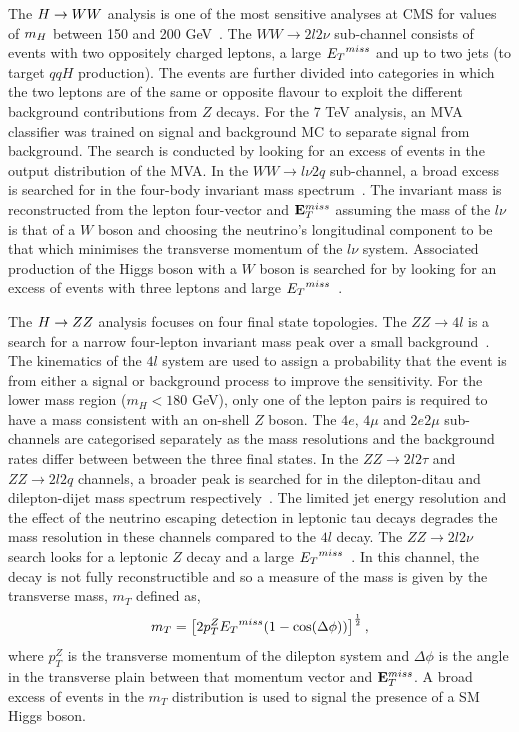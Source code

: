 The $H\rightarrow WW$ analysis is one of the most sensitive analyses at CMS for
values of $m_{H}$ between 150 and 200 GeV~\citep{HIG-12-017}. 
The $WW\rightarrow2l2\nu$ sub-channel consists of events with 
two oppositely charged leptons, a large ${E_{T}}^{miss}$ and up 
to two jets (to target $qqH$ production).
The events are further divided into categories in which the two leptons
are of the same or opposite flavour to exploit the different
background contributions from $Z$ decays. For the 7 TeV analysis,
an MVA classifier was trained on signal and background 
MC to separate signal from background. The search is conducted by looking 
for an excess of events in the output distribution of the MVA.
In the $WW\rightarrow l\nu 2q$ sub-channel, a broad excess is searched
for in the four-body invariant mass spectrum~\citep{HIG-12-021}. 
The invariant mass is reconstructed from the lepton four-vector and ${\mathbf{E}^{miss}_{T}}$ 
assuming the mass of the $l\nu$ is that of a $W$ boson and 
choosing the neutrino's longitudinal component to be that which minimises 
the transverse momentum of the $l\nu$ system.
Associated production of the Higgs boson with a $W$ boson is searched for 
by looking for an excess of events with three leptons and large 
${E_{T}}^{miss}$~\citep{HIG-11-034}.

The $H\rightarrow ZZ$ analysis focuses on four final state topologies.
The $ZZ\rightarrow 4l$ is a search for a narrow four-lepton invariant mass 
peak over a small background~\citep{HIG-12-016}. The kinematics of the $4l$ system are used
to assign a probability that the event is from either a signal or background 
process to improve the sensitivity. For the lower mass region ($m_{H}<180$ GeV),
only one of the lepton pairs is required to have a mass consistent with an 
on-shell $Z$ boson.
The $4e$, $4\mu$ and $2e2\mu$ sub-channels are categorised separately as the 
mass resolutions and the background rates differ between between the three 
final states. In the $ZZ\rightarrow 2l2\tau$ and $ZZ\rightarrow 2l2q$ channels, 
a broader peak is searched for in the dilepton-ditau and dilepton-dijet
mass spectrum respectively~\citep{HIG-12-016,HIG-11-027}. 
The limited jet energy resolution
and the effect of the neutrino escaping detection in leptonic tau decays
degrades the mass resolution in these channels compared to the $4l$ decay.
The $ZZ\rightarrow 2l2\nu$ search looks for a leptonic $Z$ decay
and a large ${E_{T}}^{miss}$~\citep{HIG-12-023}.
In this channel, the decay is not fully reconstructible and so a measure of the mass
is given by the transverse mass, $m_{T}$ defined as,
\begin{equation}
m_{T} = \left[2 p_{T}^{Z}{E_{T}}^{miss}(1-\cos(\Delta\phi))\right]^{\frac{1}{2}},
\end{equation}
where $p_{T}^{Z}$ is the transverse momentum of the dilepton system and 
$\Delta\phi$ is the angle in the transverse plain between that momentum vector and 
${\mathbf{E}^{miss}_{T}}$.
A broad excess of events in the $m_{T}$ distribution is used to signal the presence 
of a SM Higgs boson.


